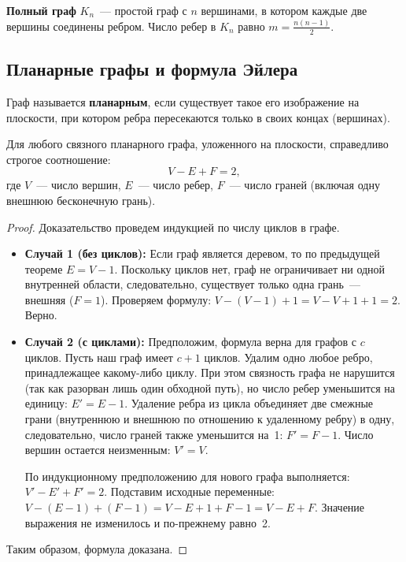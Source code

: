\begin{definition}
\textbf{Полный граф} $K_n$~--- простой граф с $n$ вершинами, в котором каждые две вершины соединены ребром. Число ребер в $K_n$ равно $m = \frac{n(n-1)}{2}$.
\end{definition}

\subsection{Планарные графы и формула Эйлера}

\begin{definition}
Граф называется \textbf{планарным}, если существует такое его изображение на плоскости, при котором ребра пересекаются только в своих концах (вершинах).
\end{definition}

\begin{theorem}
Для любого связного планарного графа, уложенного на плоскости, справедливо строгое соотношение:
\[
V - E + F = 2,
\]
где $V$~--- число вершин, $E$~--- число ребер, $F$~--- число граней (включая одну внешнюю бесконечную грань).
\end{theorem}

\begin{proof}
Доказательство проведем индукцией по числу циклов в графе.
\begin{itemize}
\item \textbf{Случай 1 (без циклов):} Если граф является деревом, то по предыдущей теореме $E = V - 1$. Поскольку циклов нет, граф не ограничивает ни одной внутренней области, следовательно, существует только одна грань~--- внешняя ($F = 1$).
Проверяем формулу: $V - (V - 1) + 1 = V - V + 1 + 1 = 2$. Верно.
\item \textbf{Случай 2 (с циклами):} Предположим, формула верна для графов с $c$ циклов. Пусть наш граф имеет $c + 1$ циклов. 
Удалим одно любое ребро, принадлежащее какому-либо циклу. 
При этом связность графа не нарушится (так как разорван лишь один обходной путь), но число ребер уменьшится на единицу: $E' = E - 1$. 
Удаление ребра из цикла объединяет две смежные грани (внутреннюю и внешнюю по отношению к удаленному ребру) в одну, следовательно, число граней также уменьшится на~1: $F' = F - 1$. 
Число вершин остается неизменным: $V' = V$.

По индукционному предположению для нового графа выполняется: $V' - E' + F' = 2$.
Подставим исходные переменные: $V - (E - 1) + (F - 1) = V - E + 1 + F - 1 = V - E + F$.
Значение выражения не изменилось и по-прежнему равно~2.
\end{itemize}
Таким образом, формула доказана.
\end{proof}

